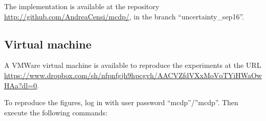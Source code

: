 The implementation is available at the repository \url{http://github.com/AndreaCensi/mcdp/},
in the branch ``uncertainty\_sep16''.

\subsection{Virtual machine }

A VMWare virtual machine is available to reproduce the experiments
at the URL \url{https://www.dropbox.com/sh/nfpnfgjh9hpcgvh/AACVZfdVXxMoVqTYiHWaOwHAa?dl=0}.

To reproduce the figures, log in with user password ``mcdp''/''mcdp''.
Then execute the following commands:


\clearpage


